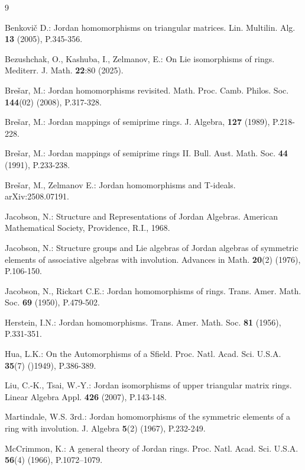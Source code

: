 \documentclass[12pt]{amsart}
\begin{document}
{\begin{thebibliography}{9}
	
	 	Benkovi\v{c} D.: Jordan homomorphisms on triangular matrices.
	Lin. Multilin. Alg. \textbf{13} (2005), P.345-356.
	
	
	
	 Bezushchak, O., Kashuba, I., Zelmanov, E.: On Lie isomorphisms of rings. Mediterr. J. Math. \textbf{22}:80 (2025).
	
	

 Bre\v{s}ar, M.: Jordan homomorphisms revisited. Math. Proc. Camb. Philos. Soc. \textbf{144}(02) (2008), P.317-328.


	
	 Bre\v{s}ar, M.: Jordan mappings of semiprime rings.	J. Algebra, \textbf{127} (1989), P.218-228.
	
	 Bre\v{s}ar, M.: Jordan mappings of semiprime rings II.		Bull. Aust. Math. Soc. \textbf{44} (1991), P.233-238.
	
		 Bre\v{s}ar, M., Zelmanov E.: Jordan homomorphisms and T-ideals.	arXiv:2508.07191.
	
	 Jacobson, N.: Structure and Representations of Jordan Algebras. American Mathematical Society, Providence, R.I., 1968.
	
	
			 Jacobson, N.: Structure groups and Lie algebras of Jordan algebras of symmetric elements of associative algebras with involution. Advances in Math. \textbf{20}(2) (1976), P.106-150.

	 Jacobson, N., Rickart C.E.: Jordan homomorphisms of rings.	Trans. Amer. Math. Soc. \textbf{69} (1950),  P.479-502.
	

	
	  Herstein, I.N.:	Jordan homomorphisms.	Trans. Amer. Math. Soc. \textbf{81} (1956),  P.331-351.
	
		 Hua, L.K.: On the Automorphisms of a Sfield. Proc. Natl. Acad. Sci. U.S.A. \textbf{35}(7)  ()1949), P.386-389.  
	
   Liu, C.-K.,  Tsai, W.-Y.: Jordan isomorphisms of upper triangular matrix rings. Linear Algebra Appl. \textbf{426} (2007), P.143-148.


		
	 	 Martindale, W.S. 3rd.: Jordan homomorphisms of the symmetric elements of a ring with involution. J. Algebra \textbf{5}(2) (1967), P.232-249.
	
 
  McCrimmon, K.: A general theory of Jordan rings. Proc. Natl. Acad. Sci. U.S.A. \textbf{56}(4) (1966), P.1072–1079.
 

\end{thebibliography}}
\end{document}
